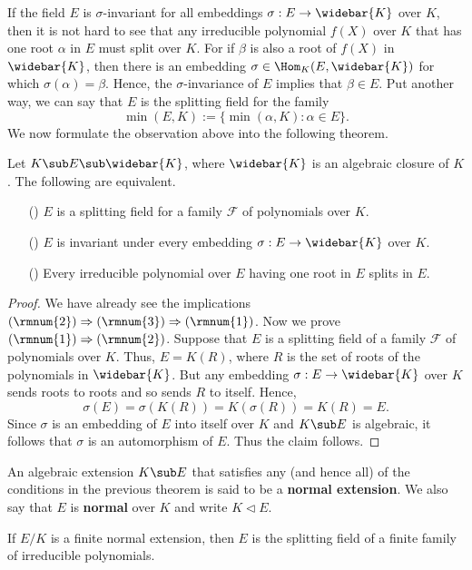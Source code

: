If the field $E$ is $\sigma$-invariant for all embeddings $\sigma:E\to\widebar{K}$ over $K$, then it is not hard to see that any irreducible polynomial $f(X)$ over $K$ that has one root $\alpha$ in $E$ must split over $K$. For if $\beta$ is also a root of $f(X)$ in $\widebar{K}$, then there is an embedding $\sigma\in\Hom_K(E,\widebar{K})$ for which $\sigma(\alpha)=\beta$. Hence, the $\sigma$-invariance of $E$ implies that $\beta\in E$. Put another way, we can say that $E$ is the splitting field for the family
\[\min(E,K):=\{\min(\alpha,K):\alpha\in E\}.\]
We now formulate the observation above into the following theorem.
\begin{theorem}\label{field ext is a spliting iff}
Let $K\sub E\sub\widebar{K}$, where $\widebar{K}$ is an algebraic closure of $K$. The following are equivalent.
\begin{itemize}
\item[(\rmnum{1})] $E$ is a splitting field for a family $\mathcal{F}$ of polynomials over $K$.
\item[(\rmnum{2})] $E$ is invariant under every embedding $\sigma:E\to\widebar{K}$ over $K$.
\item[(\rmnum{3})] Every irreducible polynomial over $E$ having one root in $E$ splits in $E$.
\end{itemize}
\end{theorem}
\begin{proof}
We have already see the implications $(\rmnum{2})\Rightarrow(\rmnum{3})\Rightarrow(\rmnum{1})$. Now we prove $(\rmnum{1})\Rightarrow(\rmnum{2})$. Suppose that $E$ is a splitting field of a family $\mathcal{F}$ of polynomials over $K$. Thus, $E=K(R)$, where $R$ is the set of roots of the polynomials in $\widebar{K}$. But any embedding $\sigma:E\to\widebar{K}$ over $K$ sends roots to roots and so sends $R$ to itself. Hence,
\[\sigma(E)=\sigma(K(R))=K(\sigma(R))=K(R)=E.\]
Since $\sigma$ is an embedding of $E$ into itself over $K$ and $K\sub E$ is algebraic, it follows that $\sigma$ is an automorphism of $E$. Thus the claim follows.
\end{proof}
\begin{definition}
An algebraic extension $K\sub E$ that satisfies any (and hence all) of the conditions in the previous theorem is said to be a \textbf{normal extension}. We also say that $E$ is \textbf{normal} over $K$ and write $K\lhd E$.
\end{definition}
\begin{corollary}\label{field ext finite normal iff split of finite poly}
If $E/K$ is a finite normal extension, then $E$ is the splitting field of a finite family of irreducible polynomials.
\end{corollary}
